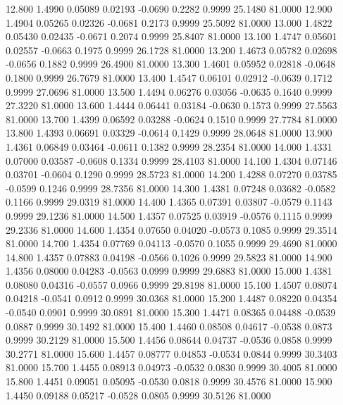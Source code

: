   12.800   1.4990   0.05089   0.02193  -0.0690   0.2282   0.9999  25.1480  81.0000
  12.900   1.4904   0.05265   0.02326  -0.0681   0.2173   0.9999  25.5092  81.0000
  13.000   1.4822   0.05430   0.02435  -0.0671   0.2074   0.9999  25.8407  81.0000
  13.100   1.4747   0.05601   0.02557  -0.0663   0.1975   0.9999  26.1728  81.0000
  13.200   1.4673   0.05782   0.02698  -0.0656   0.1882   0.9999  26.4900  81.0000
  13.300   1.4601   0.05952   0.02818  -0.0648   0.1800   0.9999  26.7679  81.0000
  13.400   1.4547   0.06101   0.02912  -0.0639   0.1712   0.9999  27.0696  81.0000
  13.500   1.4494   0.06276   0.03056  -0.0635   0.1640   0.9999  27.3220  81.0000
  13.600   1.4444   0.06441   0.03184  -0.0630   0.1573   0.9999  27.5563  81.0000
  13.700   1.4399   0.06592   0.03288  -0.0624   0.1510   0.9999  27.7784  81.0000
  13.800   1.4393   0.06691   0.03329  -0.0614   0.1429   0.9999  28.0648  81.0000
  13.900   1.4361   0.06849   0.03464  -0.0611   0.1382   0.9999  28.2354  81.0000
  14.000   1.4331   0.07000   0.03587  -0.0608   0.1334   0.9999  28.4103  81.0000
  14.100   1.4304   0.07146   0.03701  -0.0604   0.1290   0.9999  28.5723  81.0000
  14.200   1.4288   0.07270   0.03785  -0.0599   0.1246   0.9999  28.7356  81.0000
  14.300   1.4381   0.07248   0.03682  -0.0582   0.1166   0.9999  29.0319  81.0000
  14.400   1.4365   0.07391   0.03807  -0.0579   0.1143   0.9999  29.1236  81.0000
  14.500   1.4357   0.07525   0.03919  -0.0576   0.1115   0.9999  29.2336  81.0000
  14.600   1.4354   0.07650   0.04020  -0.0573   0.1085   0.9999  29.3514  81.0000
  14.700   1.4354   0.07769   0.04113  -0.0570   0.1055   0.9999  29.4690  81.0000
  14.800   1.4357   0.07883   0.04198  -0.0566   0.1026   0.9999  29.5823  81.0000
  14.900   1.4356   0.08000   0.04283  -0.0563   0.0999   0.9999  29.6883  81.0000
  15.000   1.4381   0.08080   0.04316  -0.0557   0.0966   0.9999  29.8198  81.0000
  15.100   1.4507   0.08074   0.04218  -0.0541   0.0912   0.9999  30.0368  81.0000
  15.200   1.4487   0.08220   0.04354  -0.0540   0.0901   0.9999  30.0891  81.0000
  15.300   1.4471   0.08365   0.04488  -0.0539   0.0887   0.9999  30.1492  81.0000
  15.400   1.4460   0.08508   0.04617  -0.0538   0.0873   0.9999  30.2129  81.0000
  15.500   1.4456   0.08644   0.04737  -0.0536   0.0858   0.9999  30.2771  81.0000
  15.600   1.4457   0.08777   0.04853  -0.0534   0.0844   0.9999  30.3403  81.0000
  15.700   1.4455   0.08913   0.04973  -0.0532   0.0830   0.9999  30.4005  81.0000
  15.800   1.4451   0.09051   0.05095  -0.0530   0.0818   0.9999  30.4576  81.0000
  15.900   1.4450   0.09188   0.05217  -0.0528   0.0805   0.9999  30.5126  81.0000
